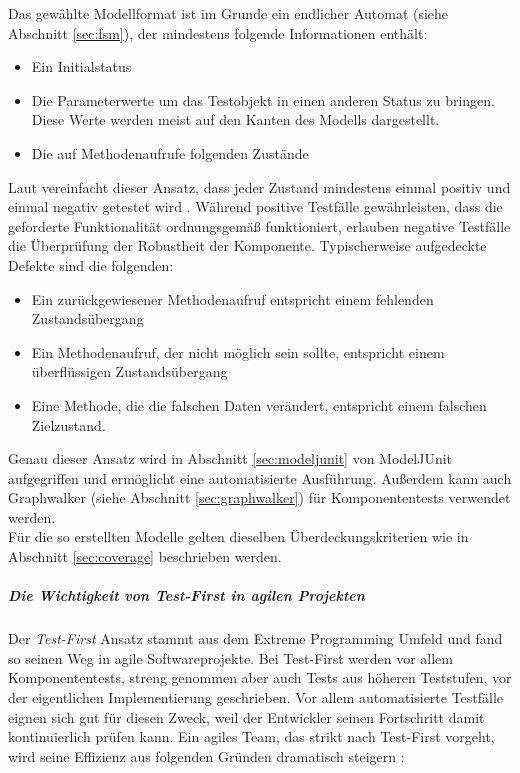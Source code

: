 Das gewählte Modellformat ist im Grunde ein endlicher Automat (siehe Abschnitt \ref{sec:fsm}), der mindestens folgende Informationen enthält:

\begin{itemize}
\item Ein Initialstatus
\item Die Parameterwerte um das Testobjekt in einen anderen Status zu bringen. Diese Werte werden meist auf den Kanten des Modells dargestellt.
\item Die auf Methodenaufrufe folgenden Zustände
\end{itemize}

Laut \citeauthor{vigenschow_objektorientiertes_2004} vereinfacht dieser Ansatz, dass jeder Zustand mindestens einmal positiv und einmal negativ getestet wird \cite{vigenschow_objektorientiertes_2004}. Während positive Testfälle gewährleisten, dass die geforderte Funktionalität ordnungsgemäß funktioniert, erlauben negative Testfälle die Überprüfung der Robustheit der Komponente. Typischerweise aufgedeckte Defekte sind die folgenden:

\begin{itemize}
\item Ein zurückgewiesener Methodenaufruf entspricht einem fehlenden Zustandsübergang
\item Ein Methodenaufruf, der nicht möglich sein sollte, entspricht einem überflüssigen Zustandsübergang
\item Eine Methode, die die falschen Daten verändert, entspricht einem falschen Zielzustand.
\end{itemize}

Genau dieser Ansatz wird in Abschnitt \ref{sec:modeljunit} von ModelJUnit aufgegriffen und ermöglicht eine automatisierte Ausführung. Außerdem kann auch Graphwalker (siehe Abschnitt \ref{sec:graphwalker}) für Komponententests verwendet werden.\\
Für die so erstellten Modelle gelten dieselben Überdeckungskriterien wie in Abschnitt \ref{sec:coverage} beschrieben werden.

\subparagraph{Die Wichtigkeit von Test-First in agilen Projekten}  

Der \textit{Test-First} Ansatz stammt aus dem Extreme Programming Umfeld \cite{beck_extreme_2000} und fand so seinen Weg in agile Softwareprojekte. Bei Test-First werden vor allem Komponententests, streng genommen aber auch Tests aus höheren Teststufen, vor der eigentlichen Implementierung geschrieben. Vor allem automatisierte Testfälle eignen sich gut für diesen Zweck, weil der Entwickler seinen Fortschritt damit kontinuierlich prüfen kann. Ein agiles Team, das strikt nach Test-First vorgeht, wird seine Effizienz aus folgenden Gründen dramatisch steigern \cite{linz_testing_2014}:


